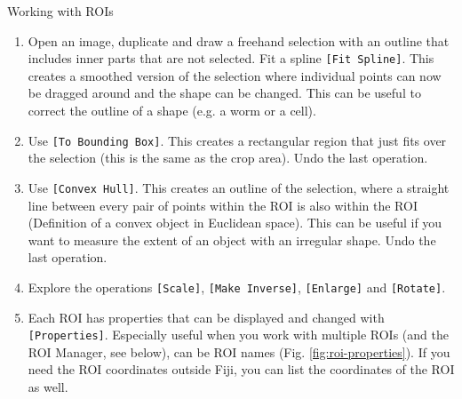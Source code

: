 \begin{taskbox}{Working with ROIs}
\begin{enumerate}
	\item Open an image, duplicate and draw a freehand selection with an outline that includes inner parts that are not selected. Fit a spline \texttt{[Fit Spline]}. This creates a smoothed version of the selection where individual points can now be dragged around and the shape can be changed. This can be useful to correct the outline of a shape (e.g. a worm or a cell). 
	\item Use \texttt{[To Bounding Box]}. This creates a rectangular region that just fits over the selection (this is the same as the crop area). Undo the last operation.
	\item Use \texttt{[Convex Hull]}. This creates an outline of the selection, where a straight line between every pair of points within the ROI is also within the ROI (Definition of a convex object in Euclidean space). This can be useful if you want to measure the extent of an object with an irregular shape. Undo the last operation.
	\item Explore the operations \texttt{[Scale]}, \texttt{[Make Inverse]}, \texttt{[Enlarge]} and \texttt{[Rotate]}.
	\item Each ROI has properties that can be displayed and changed with \texttt{[Properties]}. Especially useful when you work with multiple ROIs (and the ROI Manager, see below), can be ROI names (Fig. \ref{fig:roi-properties}). If you need the ROI coordinates outside Fiji, you can list the coordinates of the ROI as well.
	
	\begin{minipage}[t]{\linewidth}
		\begin{center}
		\medskip
		\label{fig:roi-properties}
		\end{center}
	\end{minipage}
	
\end{enumerate}

\end{taskbox}

